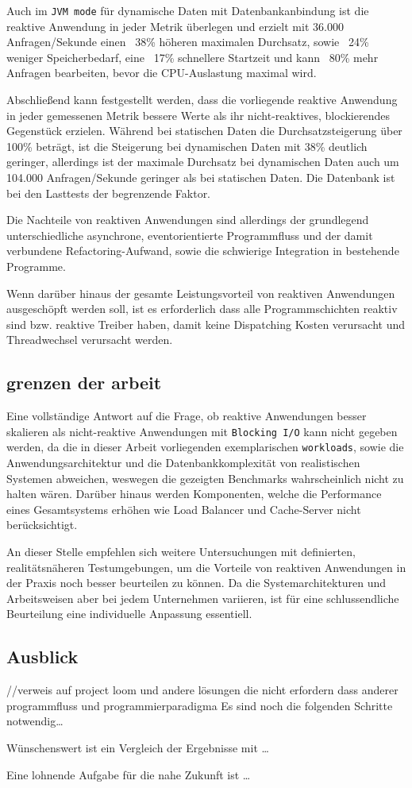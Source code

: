 Auch im \verb|JVM mode| für dynamische Daten mit Datenbankanbindung ist die reaktive Anwendung in jeder Metrik überlegen und erzielt
mit 36.000 Anfragen/Sekunde einen ~38\% höheren maximalen Durchsatz, sowie ~24\% weniger Speicherbedarf, eine ~17\% schnellere
Startzeit und kann ~80\% mehr Anfragen bearbeiten, bevor die CPU-Auslastung maximal wird.

Abschließend kann festgestellt werden, dass die vorliegende reaktive Anwendung in jeder gemessenen Metrik bessere Werte als ihr
nicht-reaktives, blockierendes Gegenstück erzielen. Während bei statischen Daten die Durchsatzsteigerung über 100\% beträgt, ist die
Steigerung bei dynamischen Daten mit 38\% deutlich geringer, allerdings ist der maximale Durchsatz bei dynamischen Daten auch
um 104.000 Anfragen/Sekunde geringer als bei statischen Daten. Die Datenbank ist bei den Lasttests der begrenzende Faktor.

Die Nachteile von reaktiven Anwendungen sind allerdings der grundlegend unterschiedliche asynchrone, eventorientierte Programmfluss
und der damit verbundene Refactoring-Aufwand, sowie die schwierige Integration in bestehende Programme.

Wenn darüber hinaus der gesamte Leistungsvorteil von reaktiven Anwendungen ausgeschöpft werden soll, ist es erforderlich
dass alle Programmschichten reaktiv sind bzw. reaktive Treiber haben, damit keine Dispatching Kosten verursacht und Threadwechsel
verursacht werden.

\subsection{grenzen der arbeit}
\label{subsec:grenzen_der_arbeit}
Eine vollständige Antwort auf die Frage, ob reaktive Anwendungen besser skalieren als nicht-reaktive Anwendungen
mit \verb|Blocking I/O| kann nicht gegeben werden, da die in dieser Arbeit vorliegenden exemplarischen \verb|workloads|, sowie
die Anwendungsarchitektur und die Datenbankkomplexität von realistischen Systemen abweichen, weswegen die gezeigten Benchmarks
wahrscheinlich nicht zu halten wären.
Darüber hinaus werden Komponenten, welche die Performance eines Gesamtsystems erhöhen wie Load Balancer und Cache-Server
nicht berücksichtigt.

An dieser Stelle empfehlen sich weitere Untersuchungen mit definierten, realitätsnäheren Testumgebungen, um die Vorteile
von reaktiven Anwendungen in der Praxis noch besser beurteilen zu können.
Da die Systemarchitekturen und Arbeitsweisen aber bei jedem Unternehmen variieren, ist für eine schlussendliche Beurteilung
eine individuelle Anpassung essentiell.

\subsection{Ausblick}
\label{subsec:ausblick}
//verweis auf project loom und andere lösungen die nicht erfordern dass anderer programmfluss und programmierparadigma
Es sind noch die folgenden Schritte notwendig…

Wünschenswert ist ein Vergleich der Ergebnisse mit …

Eine lohnende Aufgabe für die nahe Zukunft ist …
